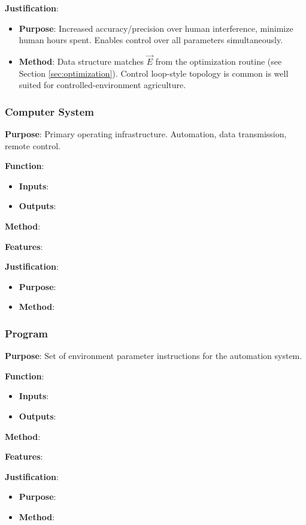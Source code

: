 \documentclass{report}
\begin{document}
\textbf{Justification}: 
\begin{itemize}
    \item \textbf{Purpose}: Increased accuracy/precision over human interference, minimize human hours spent. Enables control over all parameters simultaneously.
    \item \textbf{Method}: Data structure matches $\vec E$ from the optimization routine (see Section \ref{sec:optimization}). Control loop-style topology is common is well suited for controlled-environment agriculture.
\end{itemize}

\subsubsection{Computer System}
\label{sec:computer}

\textbf{Purpose}: Primary operating infrastructure. Automation, data transmission, remote control.

\textbf{Function}:
\begin{itemize}
    \item \textbf{Inputs}:
    \item \textbf{Outputs}:
\end{itemize}

\textbf{Method}:

\textbf{Features}:

\textbf{Justification}:
\begin{itemize}
    \item \textbf{Purpose}:
    \item \textbf{Method}:
\end{itemize}

\subsubsection{Program}
\label{sec:program}

\textbf{Purpose}: Set of environment parameter instructions for the automation system.

\textbf{Function}:
\begin{itemize}
    \item \textbf{Inputs}:
    \item \textbf{Outputs}:
\end{itemize}

\textbf{Method}:

\textbf{Features}:

\textbf{Justification}:
\begin{itemize}
    \item \textbf{Purpose}:
    \item \textbf{Method}:
\end{itemize}
\end{document}
